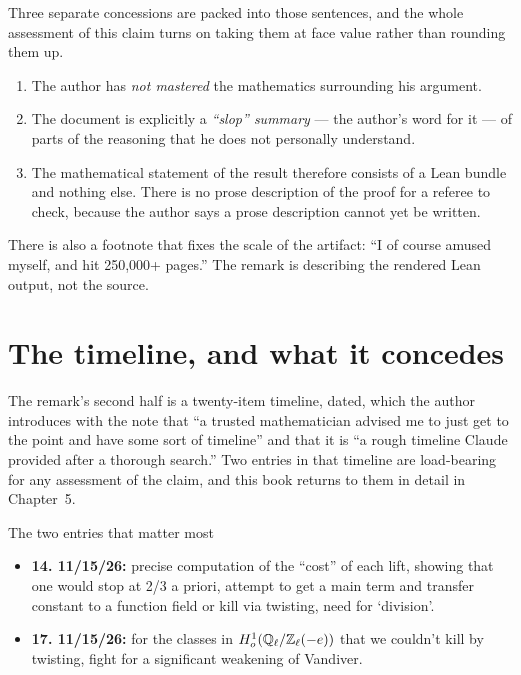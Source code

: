 Three separate concessions are packed into those sentences, and the whole
assessment of this claim turns on taking them at face value rather than
rounding them up.

\begin{enumerate}
\item The author has \emph{not mastered} the mathematics surrounding his
argument.
\item The document is explicitly a \emph{``slop'' summary} --- the author's word
for it --- of parts of the reasoning that he does not personally understand.
\item The mathematical statement of the result therefore consists of a Lean
bundle and nothing else. There is no prose description of the proof for a
referee to check, because the author says a prose description cannot yet be
written.
\end{enumerate}

There is also a footnote that fixes the scale of the artifact: ``I of course
amused myself, and hit 250,000+ pages.'' The remark is describing the rendered
Lean output, not the source.

\section{The timeline, and what it concedes}The remark's second half is a twenty-item timeline, dated, which the author
introduces with the note that ``a trusted mathematician advised me to just get to
the point and have some sort of timeline'' and that it is ``a rough timeline
Claude provided after a thorough search.'' Two entries in that timeline are
load-bearing for any assessment of the claim, and this book returns to them in
detail in Chapter~5.

\begin{seamnote}{The two entries that matter most}
\begin{itemize}
\item \textbf{14. 11/15/26:} precise computation of the ``cost'' of each lift,
showing that one would stop at 2/3 a priori, attempt to get a main term and
transfer constant to a function field or kill via twisting, need for
`division'.

\item \textbf{17. 11/15/26:} for the classes in $H^1_o(\mathbb{Q}_\ell/\mathbb{Z}_\ell(-e))$
that we couldn't kill by twisting, fight for a significant weakening of
Vandiver.
\end{itemize}
\end{seamnote}


